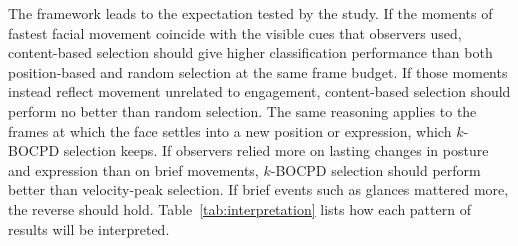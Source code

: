 The framework leads to the expectation tested by the study. If the moments of fastest facial movement coincide with the visible cues that observers used, content-based selection should give higher classification performance than both position-based and random selection at the same frame budget. If those moments instead reflect movement unrelated to engagement, content-based selection should perform no better than random selection. The same reasoning applies to the frames at which the face settles into a new position or expression, which $k$-BOCPD selection keeps. If observers relied more on lasting changes in posture and expression than on brief movements, $k$-BOCPD selection should perform better than velocity-peak selection. If brief events such as glances mattered more, the reverse should hold. Table~\ref{tab:interpretation} lists how each pattern of results will be interpreted.

